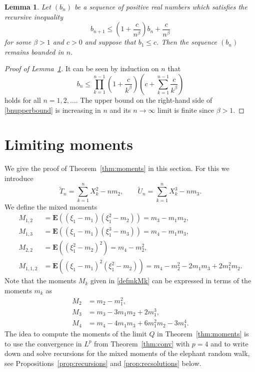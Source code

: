 \documentclass[12pt,a4paper]{article}
\newtheorem{lemma}[thm]{Lemma}
\newcommand{\E}{\mathbf E}
\newcommand{\wt}{\widetilde}
\numberwithin{equation}{section}
\begin{document}
\begin{lemma}\label{lemma:recursion2}
Let $(b_n)$ be a sequence of positive real numbers which satisfies the recursive inequality
\begin{equation}
b_{n+1}\le\left(1+\frac c{n^{\beta}}\right)b_n+\frac c{n^{\beta}}
\end{equation}
for some $\beta>1$ and $c>0$ and suppose that $b_1\le c$.
Then the sequence $(b_n)$ remains bounded in $n$.
\end{lemma}

\begin{proof}[Proof of Lemma~\ref{lemma:recursion2}]
It can be seen by induction on $n$ that
\begin{equation}\label{bnupperbound}
b_n\le\prod_{k=1}^{n-1}\left(1+\frac c{k^\beta}\right)\left(c+\sum_{k=1}^{n-1}\frac c{k^\beta}\right)
\end{equation}
holds for all $n=1,2,\dots$.
The upper bound on the right-hand side of \eqref{bnupperbound} is increasing in $n$ and its $n\to\infty$ limit is finite since $\beta>1$.
\end{proof}

\section{Limiting moments}
\label{s:moments}

We give the proof of Theorem~\ref{thm:moments} in this section.
For this we introduce
\begin{equation}
\wt T_n=\sum_{k=1}^n X_k^2-nm_2,\qquad\wt U_n=\sum_{k=1}^n X_k^3-nm_3.
\end{equation}
We define the mixed moments
\begin{align}
M_{1,2}&=\E((\xi_1-m_1)(\xi_1^2-m_2))=m_3-m_1m_2,\label{defM12}\\
M_{1,3}&=\E((\xi_1-m_1)(\xi_1^3-m_3))=m_4-m_1m_3,\label{defM13}\\
M_{2,2}&=\E((\xi_1^2-m_2)^2)=m_4-m_2^2,\label{defM22}\\
M_{1,1,2}&=\E((\xi_1-m_1)^2(\xi_1^2-m_2))=m_4-m_2^2-2m_1m_3+2m_1^2m_2.\label{defM112}
\end{align}
Note that the moments $M_k$ given in \eqref{defmkMk} can be expressed in terms of the moments $m_k$ as
\begin{align}
M_2&=m_2-m_1^2,\label{defM2}\\
M_3&=m_3-3m_1m_2+2m_1^3,\label{defM3}\\
M_4&=m_4-4m_1m_3+6m_1^2m_2-3m_1^4.\label{defM4}
\end{align}
The idea to compute the moments of the limit $Q$ in Theorem~\ref{thm:moments} is to use the convergence in $L^p$ from Theorem~\ref{thm:conv} with $p=4$
and to write down and solve recursions for the mixed moments of the elephant random walk,
see Propositions~\ref{prop:recursions} and \ref{prop:recsolutions} below.
\end{document}
